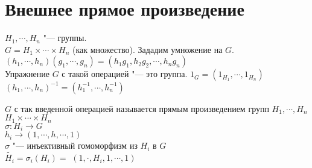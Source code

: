 ﻿\section{Внешнее прямое произведение}
$H_1, \cdots, H_n$ "--- группы.\\
$G = H_1 \times \cdots \times H_n$ (как множество).
Зададим умножение на $G$.
$(h_1,\cdots, h_n)(g_1, \cdots, g_n) = (h_1g_1, h_2g_2, \cdots, h_ng_n)$\\
Упражнение $G$ с такой операцией "--- это группа.
$1_G = (1_{H_1}, \cdots, 1_{H_n})$\\
$(h_1, \cdots, h_n)^{-1} = (h_1^{-1}, \cdots, h_n^{-1})$\\

\begin{Def}
 $G$ с так введенной операцией называется прямым произведением групп $H_1, \cdots, H_n$\\
 $H_1 \times \cdots \times H_n$\\
 $\sigma \colon H_i \to G$\\
 $h_i \to (1, \cdots,  h, \cdots, 1)$\\
 $\sigma$ "--- инъективный гомоморфизм из $H_i$ в $G$\\
 $\widetilde{H_i} = \sigma_i(H_i) = $
 $(1, \cdot, H_i, 1, \cdots, 1)$\\
\end{Def}
